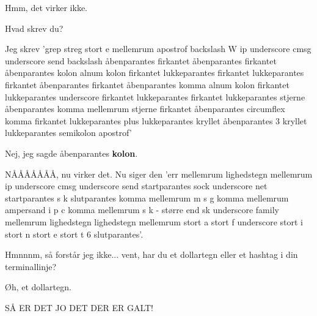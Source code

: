 \documentclass[a4paper,11pt]{article}
\begin{document}
\begin{sketch}
\scene{\texttt{grep -E '\textbackslash{}Wip\_cmsg\_send\textbackslash([[:alnum:]][[:alnum:]\_]*(, *[\^{},]+)\{3\};']}}

 Hmm, det virker ikke.

 Hvad skrev du?

 Jeg skrev 'grep streg stort e mellemrum apostrof backslash W
ip underscore cmsg underscore send backslash åbenparantes firkantet
åbenparantes firkantet åbenparantes kolon alnum kolon firkantet
lukkeparantes firkantet lukkeparantes firkantet åbenparantes firkantet
åbenparantes komma alnum kolon firkantet lukkeparantes underscore
firkantet lukkeparantes firkantet lukkeparantes stjerne åbenparantes
komma mellemrum stjerne firkantet åbenparantes circumflex komma
firkantet lukkeparantes plus lukkeparantes kryllet åbenparantes 3
kryllet lukkeparantes semikolon apostrof'

\scene{\texttt{grep -E '\textbackslash{}Wip\_cmsg\_send\textbackslash([[:alnum:]][[,alnum:]\_]*(, *[\^{},]+)\{3\};']}}

 Nej, jeg sagde åbenparantes \textbf{kolon}.

 NÅÅÅÅÅÅÅ, nu virker det.  Nu siger den 'err mellemrum lighedstegn
mellemrum ip underscore cmsg underscore send startparantes sock underscore net
startparantes s k slutparantes komma mellemrum m s g komma mellemrum ampersand i
p c komma mellemrum s k - større end sk underscore family mellemrum lighedstegn
lighedstegn mellemrum stort a stort f underscore stort i stort n stort e stort t
6 slutparantes'.

 Hmnnnm, så forstår jeg ikke...  vent, har du et dollartegn
eller et hashtag i din terminallinje?

 Øh, et dollartegn.

 SÅ ER DET JO DET DER ER GALT!


\end{sketch}
\end{document}
